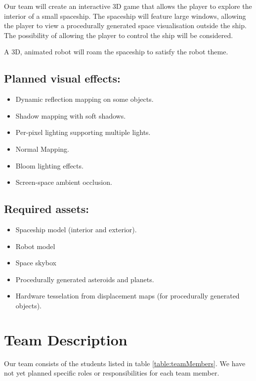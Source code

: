 \documentclass[11pt]{scrartcl} %
\begin{document}
    Our team will create an interactive 3D game that allows the player to
    explore the interior of a small spaceship.
    The spaceship will feature large
    windows, allowing the player to view a procedurally generated space
    visualisation outside the ship.
    The possibility of allowing the player to control the ship will be
    considered.

    A 3D, animated robot will roam the spaceship to satisfy the robot theme.

    \subsection*{Planned visual effects:}
    \begin{itemize}
        \item Dynamic reflection mapping on some objects.
        \item Shadow mapping with soft shadows.
        \item Per-pixel lighting supporting multiple lights.
        \item Normal Mapping.
        \item Bloom lighting effects.
        \item Screen-space ambient occlusion.
    \end{itemize}

    \subsection*{Required assets:}
    \begin{itemize}
        \item Spaceship model (interior and exterior).
        \item Robot model
        \item Space skybox
        \item Procedurally generated asteroids and planets.
        \item Hardware tesselation from displacement maps (for procedurally generated objects).
    \end{itemize}

\section*{Team Description}
    Our team consists of the students listed in table \ref{table:teamMembers}.
    We have not yet planned specific roles or responsibilities for each team
    member.
\end{document}
